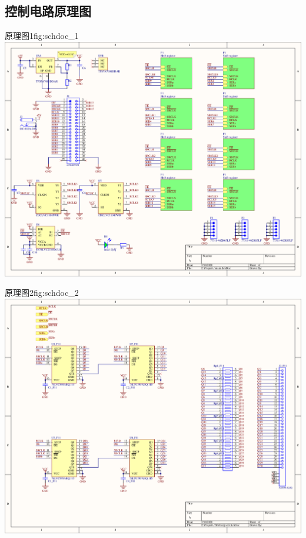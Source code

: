 \documentclass[supercite]{HustGraduPaper}
\begin{document}


\begin{appendices}

	\section{控制电路原理图}\label{sec:schdoc}

	\begin{generalfig}[htb]{原理图1}{fig:schdoc_1}
		\includegraphics[width=\linewidth]{Figures/schdoc_1.pdf}
	\end{generalfig}

	\begin{generalfig}[htb]{原理图2}{fig:schdoc_2}
		\includegraphics[width=\linewidth]{Figures/schdoc_2.pdf}
	\end{generalfig}

\end{appendices}
\end{document}

